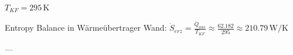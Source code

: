 \( T_{KF} = 295 \, \text{K} \)  

Entropy Balance in Wärmeübertrager Wand:  
\( \dot{S}_{erz} = \frac{\dot{Q}_{aus}}{T_{KF}} \approx \frac{62.182}{295} \approx 210.79 \, \text{W/K} \)  

---